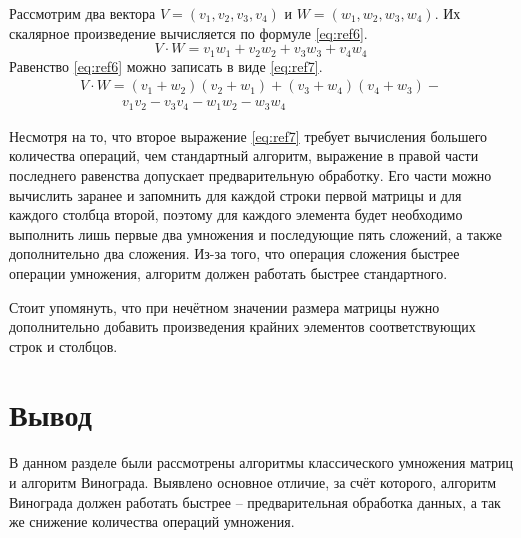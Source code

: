 Рассмотрим два вектора $V = (v_1, v_2, v_3, v_4)$ и $W = (w_1, w_2, w_3, w_4)$.
Их скалярное произведение вычисляется по формуле  \ref{eq:ref6}.
\begin{equation}
	V \cdot W = v_1w_1 + v_2w_2 + v_3w_3 + v_4w_4
	\label{eq:ref6}
\end{equation}
Равенство \ref{eq:ref6} можно записать в виде \ref{eq:ref7}.
\begin{equation}
	\begin{array}{l}
		V \cdot W = (v_1 + w_2)(v_2 + w_1) + (v_3 + w_4)(v_4 + w_3) - \\
		\quad \quad \quad v_1v_2 - v_3v_4 - w_1w_2 - w_3w_4
	\end{array}
	\label{eq:ref7}
\end{equation}

Несмотря на то, что второе выражение \ref{eq:ref7} требует вычисления большего количества операций, чем стандартный алгоритм, выражение в правой части последнего равенства допускает предварительную обработку.
Его части можно вычислить заранее и запомнить для каждой строки первой матрицы и для каждого столбца второй, поэтому для каждого элемента будет необходимо выполнить лишь первые два умножения и последующие пять сложений, а также дополнительно два сложения. 
Из-за того, что операция сложения быстрее операции умножения, алгоритм должен работать быстрее стандартного.

Стоит упомянуть, что при нечётном значении размера матрицы нужно дополнительно добавить произведения крайних элементов соответствующих строк и столбцов.

\section*{Вывод}

В данном разделе были рассмотрены алгоритмы классического умножения матриц и алгоритм Винограда.
Выявлено основное отличие, за счёт которого, алгоритм Винограда должен работать быстрее -- предварительная обработка данных, а так же снижение количества операций умножения.
